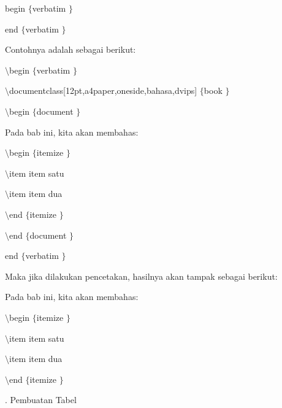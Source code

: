 begin $  \{  $verbatim $  \}  $ \par
[kalimat] \par
end $  \{  $verbatim $  \}  $ \par
\vspace{8pt}
\vspace{8pt}
Contohnya adalah sebagai berikut: \par
{\fontsize{10pt}{10pt}\selectfont  $  \setminus  $begin $  \{  $verbatim $  \}  $} \par
{\fontsize{10pt}{10pt}\selectfont  $  \setminus  $documentclass[12pt,a4paper,oneside,bahasa,dvips] $  \{  $book $  \}  $} \par
{\fontsize{10pt}{10pt}\selectfont  $  \setminus  $begin $  \{  $document $  \}  $} \par
\vspace{10pt}
{\fontsize{10pt}{10pt}\selectfont Pada bab ini, kita akan membahas:} \par
{\fontsize{10pt}{10pt}\selectfont  $  \setminus  $begin $  \{  $itemize $  \}  $} \par
{\fontsize{10pt}{10pt}\selectfont  $  \setminus  $item item satu} \par
{\fontsize{10pt}{10pt}\selectfont  $  \setminus  $item item dua} \par
{\fontsize{10pt}{10pt}\selectfont  $  \setminus  $end $  \{  $itemize $  \}  $} \par
{\fontsize{10pt}{10pt}\selectfont  $  \setminus  $end $  \{  $document $  \}  $} \par
{\fontsize{10pt}{10pt}\selectfont end $  \{  $verbatim $  \}  $} \par
\vspace{10pt}
{\fontsize{10pt}{10pt}\selectfont Maka jika dilakukan pencetakan, hasilnya akan tampak sebagai berikut:} \par
{\fontsize{10pt}{10pt}\selectfont Pada bab ini, kita akan membahas:} \par
{\fontsize{10pt}{10pt}\selectfont  $  \setminus  $begin $  \{  $itemize $  \}  $} \par
{\fontsize{10pt}{10pt}\selectfont  $  \setminus  $item item satu} \par
{\fontsize{10pt}{10pt}\selectfont  $  \setminus  $item item dua} \par
{\fontsize{10pt}{10pt}\selectfont  $  \setminus  $end $  \{  $itemize $  \}  $} \par
\vspace{10pt}
. Pembuatan Tabel \par
